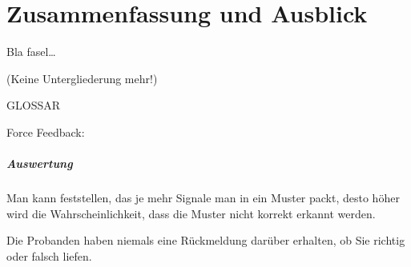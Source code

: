 
\chapter{Zusammenfassung und Ausblick}
\label{ch:Zusammenfassung}
Bla fasel\ldots

(Keine Untergliederung mehr!)




GLOSSAR

Force Feedback:




\paragraph{Auswertung}
Man kann feststellen, das je mehr Signale man in ein Muster packt, desto höher wird die Wahrscheinlichkeit, dass die Muster nicht korrekt erkannt werden. 

Die Probanden haben niemals eine R{\"u}ckmeldung dar{\"u}ber erhalten, ob Sie richtig oder falsch liefen.